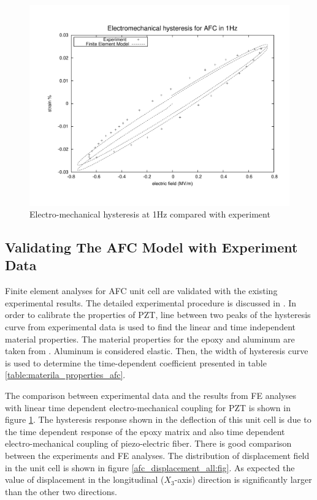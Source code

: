 \begin{figure} 
\centering
\includegraphics[width=5.0in]{./chap_4_structural_analyses/afc_unit_cell/comparison/afc_result_electric_field_vs_strain.pdf}
\caption{Electro-mechanical hysteresis at 1Hz compared with experiment}
\label{fig:afc_result_electric_field_vs_strain}
\end{figure} 

\subsection{Validating The AFC Model with Experiment Data}
Finite element analyses for AFC unit cell are validated with the existing experimental results.
The detailed experimental procedure is discussed in \cite{atillah2014}.
In order to calibrate the properties of PZT, line between two peaks of the hysteresis curve from experimental data is used to find the linear and time independent material properties.
The material properties for the epoxy and aluminum are taken from \cite{atitallah2014parametric}.
Aluminum is considered elastic.
Then, the width of hysteresis curve is used to determine the time-dependent coefficient presented in table \ref{table:materila_properties_afc}.
 
The comparison between experimental data and the results from FE analyses with linear time dependent electro-mechanical coupling for PZT is shown in figure \ref{fig:afc_result_electric_field_vs_strain}.
The hysteresis response shown in the deflection of this unit cell is due to the time dependent response of the epoxy matrix and also time dependent electro-mechanical coupling of piezo-electric fiber. 
There is good comparison between the experiments and FE analyses.
The distribution of displacement field in the unit cell is shown in figure \ref{afc_displacement_all:fig}.
As expected the value of displacement in the longitudinal ($X_3$-axis) direction is significantly larger than the other two directions.

